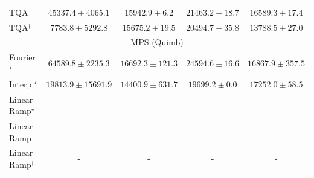 \begin{tabular}{l|cccc|}
TQA & {\cellcolor[HTML]{8B5CAA}} \color[HTML]{F1F1F1} $45337.4\pm 4065.1$ & {\cellcolor[HTML]{ACC6DF}} \color[HTML]{000000} $15942.9\pm 6.2$ & {\cellcolor[HTML]{9CB8D8}} \color[HTML]{000000} $21463.2\pm 18.7$ & {\cellcolor[HTML]{AAC4DE}} \color[HTML]{000000} $16589.3\pm 17.4$ \\
TQA$^\dagger$ & {\cellcolor[HTML]{C6D8E9}} \color[HTML]{000000} $7783.8\pm 5292.8$ & {\cellcolor[HTML]{ADC7E0}} \color[HTML]{000000} $15675.2\pm 19.5$ & {\cellcolor[HTML]{9EBCDA}} \color[HTML]{000000} $20494.7\pm 35.8$ & {\cellcolor[HTML]{B3CBE2}} \color[HTML]{000000} $13788.5\pm 27.0$ \\
\cline{1-5}
\multicolumn{5}{c}{\rule{0pt}{8pt}MPS (Quimb)} \\
\midrule
Fourier$^\star$ & {\cellcolor[HTML]{8E3104}} \color[HTML]{F1F1F1} $64589.8\pm 2235.3$ & {\cellcolor[HTML]{FECF67}} \color[HTML]{000000} $16692.3\pm 121.3$ & {\cellcolor[HTML]{FEB340}} \color[HTML]{000000} $24594.6\pm 16.6$ & {\cellcolor[HTML]{FECE65}} \color[HTML]{000000} $16867.9\pm 357.5$ \\
Interp.$^\star$ & {\cellcolor[HTML]{FEC652}} \color[HTML]{000000} $19813.9\pm 15691.9$ & {\cellcolor[HTML]{FED676}} \color[HTML]{000000} $14400.9\pm 631.7$ & {\cellcolor[HTML]{FEC754}} \color[HTML]{000000} $19699.2\pm 0.0$ & {\cellcolor[HTML]{FECD63}} \color[HTML]{000000} $17252.0\pm 58.5$ \\
Linear Ramp$^\star$ & {\cellcolor[HTML]{000000}} \color[HTML]{F1F1F1} {\cellcolor{white}} \color{black} - & {\cellcolor[HTML]{000000}} \color[HTML]{F1F1F1} {\cellcolor{white}} \color{black} - & {\cellcolor[HTML]{000000}} \color[HTML]{F1F1F1} {\cellcolor{white}} \color{black} - & {\cellcolor[HTML]{000000}} \color[HTML]{F1F1F1} {\cellcolor{white}} \color{black} - \\
Linear Ramp & {\cellcolor[HTML]{000000}} \color[HTML]{F1F1F1} {\cellcolor{white}} \color{black} - & {\cellcolor[HTML]{000000}} \color[HTML]{F1F1F1} {\cellcolor{white}} \color{black} - & {\cellcolor[HTML]{000000}} \color[HTML]{F1F1F1} {\cellcolor{white}} \color{black} - & {\cellcolor[HTML]{000000}} \color[HTML]{F1F1F1} {\cellcolor{white}} \color{black} - \\
Linear Ramp$^\dagger$ & {\cellcolor[HTML]{000000}} \color[HTML]{F1F1F1} {\cellcolor{white}} \color{black} - & {\cellcolor[HTML]{000000}} \color[HTML]{F1F1F1} {\cellcolor{white}} \color{black} - & {\cellcolor[HTML]{000000}} \color[HTML]{F1F1F1} {\cellcolor{white}} \color{black} - & {\cellcolor[HTML]{000000}} \color[HTML]{F1F1F1} {\cellcolor{white}} \color{black} - \\

\end{tabular}
